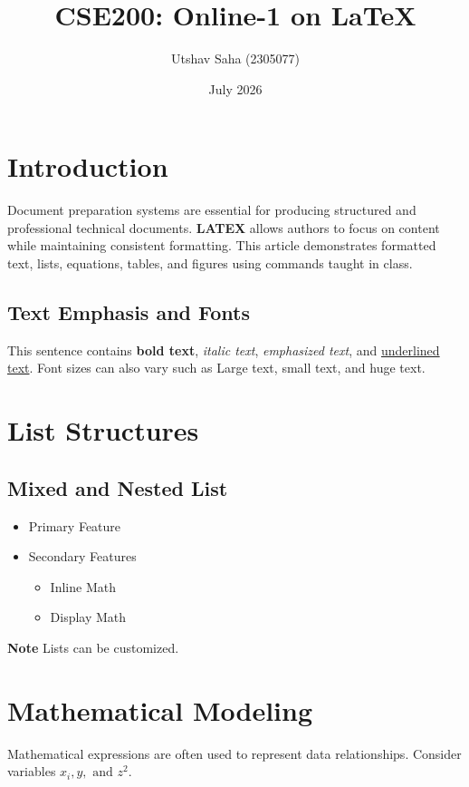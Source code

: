 \documentclass{article}
\title{CSE200: Online-1 on \LaTeX}
\author{Utshav Saha (2305077)}
\date{July 2026}
\begin{document}
\maketitle

\section{Introduction}

Document preparation systems are essential for producing structured and professional technical documents. \textbf{LATEX} allows authors to focus on content while maintaining consistent formatting. This article demonstrates formatted text, lists, equations, tables, and figures using commands taught in class.

\subsection{Text Emphasis and Fonts}
This sentence contains \textbf{bold text}, \textit{italic text}, \emph{emphasized text}, and \underline{underlined text}. Font sizes can also vary such as {\Large Large text}, {\small small text}, and {\Huge huge text}.

\section{List Structures}
\subsection{Mixed and Nested List}
\begin{itemize}
    \item Primary Feature
    \item Secondary Features
        \begin{itemize}
    \item[-] Inline Math
    \item[-] Display Math
        \end{itemize}
\end{itemize}

\textbf{Note} Lists can be customized.

\section{Mathematical Modeling}
Mathematical expressions are often used to represent data relationships. Consider variables $x_i, y, \text{ and } z^2.$
\end{document}
